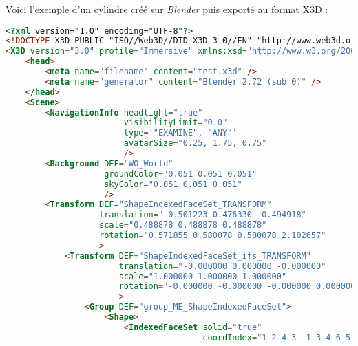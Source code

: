 Voici l'exemple d'un cylindre créé sur \textit{Blender} puis exporté au format X3D :
\begin{lstlisting}[language=Html]
<?xml version="1.0" encoding="UTF-8"?>
<!DOCTYPE X3D PUBLIC "ISO//Web3D//DTD X3D 3.0//EN" "http://www.web3d.org/specifications/x3d-3.0.dtd">
<X3D version="3.0" profile="Immersive" xmlns:xsd="http://www.w3.org/2001/XMLSchema-instance" xsd:noNamespaceSchemaLocation="http://www.web3d.org/specifications/x3d-3.0.xsd">
	<head>
		<meta name="filename" content="test.x3d" />
		<meta name="generator" content="Blender 2.72 (sub 0)" />
	</head>
	<Scene>
		<NavigationInfo headlight="true"
		                visibilityLimit="0.0"
		                type='"EXAMINE", "ANY"'
		                avatarSize="0.25, 1.75, 0.75"
		                />
		<Background DEF="WO_World"
		            groundColor="0.051 0.051 0.051"
		            skyColor="0.051 0.051 0.051"
		            />
		<Transform DEF="ShapeIndexedFaceSet_TRANSFORM"
		           translation="-0.501223 0.476330 -0.494918"
		           scale="0.488878 0.488878 0.488878"
		           rotation="0.571855 0.580078 0.580078 2.102657"
		           >
			<Transform DEF="ShapeIndexedFaceSet_ifs_TRANSFORM"
			           translation="-0.000000 0.000000 -0.000000"
			           scale="1.000000 1.000000 1.000000"
			           rotation="-0.000000 -0.000000 -0.000000 0.000000"
			           >
				<Group DEF="group_ME_ShapeIndexedFaceSet">
					<Shape>
						<IndexedFaceSet solid="true"
						                coordIndex="1 2 4 3 -1 3 4 6 5 -1 5 6 8 7 -1 7 8 10 9 -1 9 10 12 11 -1 11 12 14 13 -1 13 14 16 15 -1 15 16 18 17 -1 17 18 20 19 -1 19 20 22 21 -1 21 22 24 23 -1 23 24 26 25 -1 25 26 28 27 -1 27 28 30 29 -1 29 30 32 31 -1 31 32 34 33 -1 33 34 36 35 -1 35 36 38 37 -1 37 38 40 39 -1 39 40 42 41 -1 41 42 44 43 -1 43 44 46 45 -1 45 46 48 47 -1 47 48 50 49 -1 49 50 52 51 -1 51 52 54 53 -1 53 54 56 55 -1 55 56 58 57 -1 57 58 60 59 -1 59 60 62 61 -1 4 8 6 -1 12 10 8 -1 16 14 12 -1 20 18 16 -1 24 22 20 -1 28 26 24 -1 32 30 28 -1 36 34 32 -1 40 38 36 -1 44 42 40 -1 48 46 44 -1 52 50 48 -1 56 54 52 -1 60 58 56 -1 64 62 60 -1 4 2 64 -1 4 12 8 -1 20 16 12 -1 28 24 20 -1 36 32 28 -1 44 40 36 -1 52 48 44 -1 60 56 52 -1 4 64 60 -1 4 20 12 -1 36 28 20 -1 52 44 36 -1 4 60 52 -1 4 36 20 -1 4 52 36 -1 2 1 63 64 -1 61 62 64 63 -1 1 61 63 -1 57 59 61 -1 53 55 57 -1 49 51 53 -1 45 47 49 -1 41 43 45 -1 37 39 41 -1 33 35 37 -1 29 31 33 -1 25 27 29 -1 21 23 25 -1 17 19 21 -1 13 15 17 -1 9 11 13 -1 5 7 9 -1 1 3 5 -1 1 57 61 -1 49 53 57 -1 41 45 49 -1 33 37 41 -1 25 29 33 -1 17 21 25 -1 9 13 17 -1 1 5 9 -1 1 49 57 -1 33 41 49 -1 17 25 33 -1 1 9 17 -1 1 33 49 -1 1 17 33 -1 "

\end{lstlisting}
